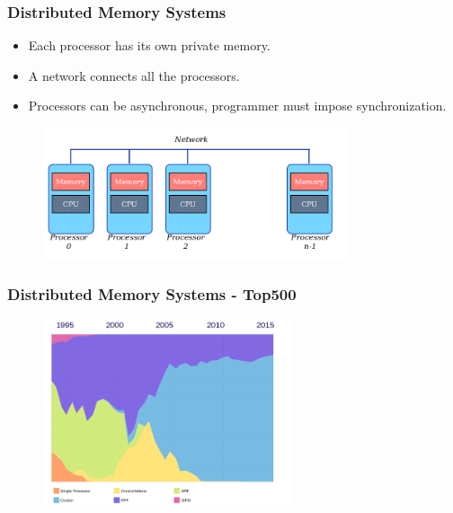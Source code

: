 \begin{frame}\frametitle{Distributed Memory Systems}



\begin{itemize}
\item Each processor has its own private memory.
\item A network connects all the processors.
\item Processors can be asynchronous, programmer must impose synchronization. 
\end{itemize}

\begin{figure}
\centering
\includegraphics[width=0.8\textwidth]{img/distributeArchitecture.png}
\end{figure} 

  
\end{frame}

\begin{frame}\frametitle{Distributed Memory Systems - Top500}

\begin{figure}
\centering
\includegraphics[width=0.65\textwidth]{img/top500.png}
\end{figure} 

  
\end{frame}




